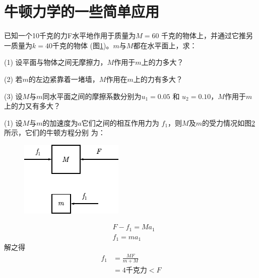 \section{牛顿力学的一些简单应用}\label{sec:03.05}

\example 已知一个10千克的力F水平地作用于质量为$ M = 6 0 $
千克的物体上，并通过它推另一质量为$ k = 4 0 $千克的物体
(图\ref{fig:03.08})。$ m $与$ M $都在水平面上，求：

(1) 设平面与物体之间无摩擦力，$ M $作用于$ m $上的力多大？

(2) 若$ m $的左边紧靠着一堵墙，$ M $作用在$ m $上的力有多大？

(3) 设$ M $与$ m $同水平面之间的摩擦系数分别为$ u _ { 1 } = 0 . 0 5 $ 和
$ u _ { 2 } = 0 . 1 0 $，$ M $作用于$ m $上的力又有多大？
\begin{figure}[!h]
    \centering
 \caption{}
 \label{fig:03.08}
\end{figure}

\solution (1) 设$ M $与$ m $的加速度为$ a $它们之间的相互作用力为
$f_1$，则$ M $及$ m $的受力情况如图\ref{fig:03.09} 所示，它们的牛顿方程分别
为：
\begin{figure}
    \centering
    \includegraphics{figure/fig03.09}
    \caption{}
    \label{fig:03.09}
\end{figure}
\vspace{-1.4em}
\begin{align*}
 &F - f _ { 1 } = M a _ { 1 } \\
 &f _ { 1 } = m a _ { 1 }
\end{align*}
解之得
\begin{align*}
 f _ { 1 } &= \frac { M F } { m + M } \\
  &=4\text{千克力} < F
\end{align*}

